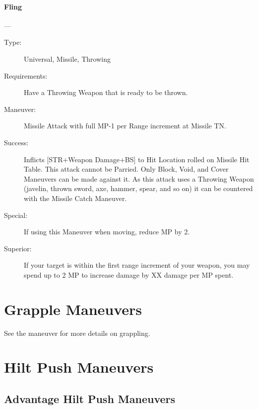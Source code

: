\documentclass[oneside,11pt,english]{book}
\begin{document}
\paragraph{\large\label{man:Fling}Fling}---\quad{\large[???????]}
\vspace{-10pt}\begin{description} 
\item [Type:] Universal, Missile, Throwing 
\item [Requirements:] Have a Throwing Weapon that is ready to be thrown. 
\item [Maneuver:] Missile Attack with full MP-1 per Range increment at Missile TN. 
\item [Success:] Inflicts [STR+Weapon Damage+BS] to Hit Location rolled on Missile Hit Table. 
  This attack cannot be Parried. Only Block, Void, and Cover Maneuvers can be made against it. 
  As this attack uses a Throwing Weapon (javelin, thrown sword, axe, hammer, spear, and so on) it can be 
  countered with the Missile Catch Maneuver. 
\item [Special:] If using this Maneuver when moving, reduce MP by 2. 
\item [Superior:] If your target is within the first range increment of your weapon, you may spend up to 2 MP to 
  increase damage by XX damage per MP spent. 
\end{description}

\section{Grapple Maneuvers} \label{sec:Grappling}
See the  maneuver for more details on grappling.



\section{Hilt Push Maneuvers}
\subsection{Advantage Hilt Push Maneuvers}
\end{document}

